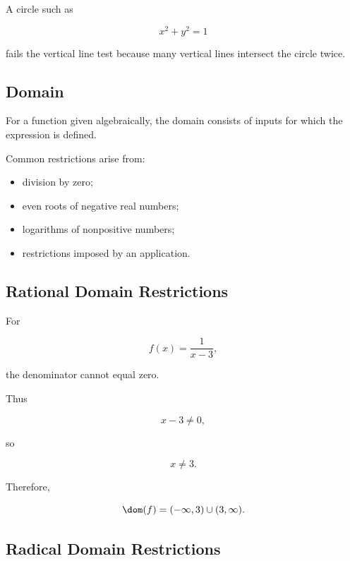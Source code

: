 A circle such as

\[ x^2+y^2=1 \]

fails the vertical line test because many vertical lines intersect the
circle twice.

\subsection{Domain}
\label{subsec:analysis-domain}

For a function given algebraically, the domain consists of inputs for which
the expression is defined.

Common restrictions arise from:

\begin{itemize}
    \item division by zero;
    \item even roots of negative real numbers;
    \item logarithms of nonpositive numbers;
    \item restrictions imposed by an application.
\end{itemize}

\subsection{Rational Domain Restrictions}
\label{subsec:rational-domain-restrictions}

For

\[ f(x)=\frac{1}{x-3}, \]

the denominator cannot equal zero.

Thus

\[ x-3\neq0, \]

so

\[ x\neq3. \]

Therefore,

\[ \dom(f)=(-\infty,3)\cup(3,\infty). \]

\subsection{Radical Domain Restrictions}
\label{subsec:radical-domain-restrictions}

